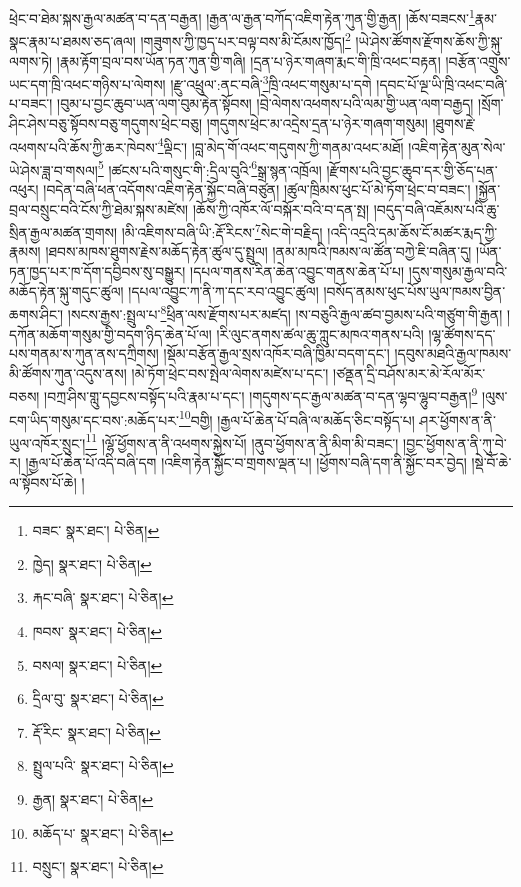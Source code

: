 ཕྲེང་བ་ཐེམ་སྐས་རྒྱལ་མཚན་བ་དན་བརྒྱན། །རྒྱན་ལ་རྒྱན་བཀོད་འཇིག་རྟེན་ཀུན་གྱི་རྒྱན། །ཆོས་བཟངས་\footnote{བཟང་  སྣར་ཐང་།  པེ་ཅིན། }རྣམ་སྣང་རྣམ་པ་ཐམས་ཅད་ཞལ། །གཟུགས་ཀྱི་ཁྱད་པར་བལྟ་བས་མི་ངོམས་ཁྱོད།\footnote{ཁྱེད།  སྣར་ཐང་།  པེ་ཅིན། } །ཡེ་ཤེས་ཚོགས་རྫོགས་ཆོས་ཀྱི་སྐུ་ལགས་ཏེ། །རྣམ་རྟོག་བྲལ་བས་ཡོན་ཏན་ཀུན་གྱི་གཞི། །དྲན་པ་ཉེར་གཞག་རྨང་གི་ཁྲི་འཕང་བརྟན། །བརྩོན་འགྲུས་ཡང་དག་ཁྲི་འཕང་གཉིས་པ་ལེགས། །རྫུ་འཕྲུལ་:ནང་བཞི་\footnote{རྐང་བཞི་  སྣར་ཐང་།  པེ་ཅིན། }ཁྲི་འཕང་གསུམ་པ་དགེ །དབང་པོ་ལྔ་ཡི་ཁྲི་འཕང་བཞི་པ་བཟང་། །བུམ་པ་བྱང་ཆུབ་ཡན་ལག་བུམ་རྟེན་སྟོབས། །བྲེ་ལེགས་འཕགས་པའི་ལམ་གྱི་ཡན་ལག་བརྒྱད། །སྲོག་ཤིང་ཤེས་བཅུ་སྟོབས་བཅུ་གདུགས་ཕྲེང་བཅུ། །གདུགས་ཕྲེང་མ་འདྲེས་དྲན་པ་ཉེར་གཞག་གསུམ། །ཐུགས་རྗེ་འཕགས་པའི་ཆོས་ཀྱི་ཆར་ཁེབས་\footnote{ཁབས་  སྣར་ཐང་།  པེ་ཅིན། }ལྡིང་། །བླ་མེད་གོ་འཕང་གདུགས་ཀྱི་གནམ་འཕང་མཐོ། །འཇིག་རྟེན་མུན་སེལ་ཡེ་ཤེས་ཟླ་བ་གསལ།\footnote{བསལ།  སྣར་ཐང་།  པེ་ཅིན། } །ཚངས་པའི་གསུང་གི་:དྲིལ་བུའི་\footnote{དྲིལ་བུ་  སྣར་ཐང་།  པེ་ཅིན། }སྒྲ་སྙན་འཁྲོལ། །རྫོགས་པའི་བྱང་ཆུབ་དར་གྱི་ཅོད་པན་འཕུར། །བདེན་བཞི་ཕན་འདོགས་འཇིག་རྟེན་སྐྱོང་བཞི་བཙུན། །ཚུལ་ཁྲིམས་ཕུང་པོ་མེ་ཏོག་ཕྲེང་བ་བཟང་། །སྐྱོན་བྲལ་བསྲུང་བའི་ངོས་ཀྱི་ཐེམ་སྐས་མཛེས། །ཆོས་ཀྱི་འཁོར་ལོ་བསྐོར་བའི་བ་དན་སྤ། །བདུད་བཞི་འཇོམས་པའི་ཆུ་སྲིན་རྒྱལ་མཚན་གྲགས། །མི་འཇིགས་བཞི་ཡི་:རྡོ་རིངས་\footnote{རྡོ་རིང་  སྣར་ཐང་།  པེ་ཅིན། }སེང་གེ་བརྗིད། །འདི་འདྲའི་དམ་ཆོས་ངོ་མཚར་རྨད་ཀྱི་རྣམས། །ཐབས་མཁས་ཐུགས་རྗེས་མཆོད་རྟེན་ཚུལ་དུ་སྤྲུལ། །ནམ་མཁའི་ཁམས་ལ་ཚོན་བཀྱེ་ཇི་བཞིན་དུ། །ཡོན་ཏན་ཁྱད་པར་ཁ་དོག་དབྱིབས་སུ་བསྒྱུར། །དཔལ་གནས་རིན་ཆེན་འབྱུང་གནས་ཆེན་པོ་པ། །དུས་གསུམ་རྒྱལ་བའི་མཆོད་རྟེན་སྐུ་གདུང་ཚུལ། །དཔལ་འབྱུང་ཀ་ནི་ཀ་དང་རབ་འབྱུང་ཚུལ། །བསོད་ནམས་ཕུང་པོས་ཡུལ་ཁམས་བྱིན་ཆགས་ཤིང་། །སངས་རྒྱས་:སྤྲུལ་པ་\footnote{སྤྲུལ་པའི་  སྣར་ཐང་།  པེ་ཅིན། }ཕྲིན་ལས་རྫོགས་པར་མཛད། །ས་བཅུའི་རྒྱལ་ཚབ་བྱམས་པའི་གཙུག་གི་རྒྱན། །དཀོན་མཆོག་གསུམ་གྱི་བདག་ཉིད་ཆེན་པོ་ལ། །རི་ལུང་ནགས་ཚལ་ཆུ་ཀླུང་མཁའ་གནས་པའི། །ལྷ་ཚོགས་དད་པས་གནམ་ས་ཀུན་ནས་དཀྲིགས། །སྡོམ་བརྩོན་རྒྱལ་སྲས་འཁོར་བཞི་ཁྱིམ་བདག་དང་། །དབུས་མཐའི་རྒྱལ་ཁམས་མི་ཚོགས་ཀུན་འདུས་ནས། །མེ་ཏོག་ཕྲེང་བས་སྤེལ་ལེགས་མཛེས་པ་དང་། །ཙནྡན་དྲི་བཤོས་མར་མེ་རོལ་མོར་བཅས། །བཀྲ་ཤིས་གླུ་དབྱངས་བསྟོད་པའི་རྣམ་པ་དང་། །གདུགས་དང་རྒྱལ་མཚན་བ་དན་ལྷབ་ལྷུབ་བརྒྱན།\footnote{རྒྱན།  སྣར་ཐང་།  པེ་ཅིན། } །ལུས་ངག་ཡིད་གསུམ་དང་བས་:མཆོད་པར་\footnote{མཆོད་པ་  སྣར་ཐང་།  པེ་ཅིན། }བགྱི། །རྒྱལ་པོ་ཆེན་པོ་བཞི་ལ་མཆོད་ཅིང་བསྟོད་པ། ཤར་ཕྱོགས་ན་ནི་ཡུལ་འཁོར་སྲུང་།\footnote{བསྲུང་།  སྣར་ཐང་།  པེ་ཅིན། } །ལྷོ་ཕྱོགས་ན་ནི་འཕགས་སྐྱེས་པོ། །ནུབ་ཕྱོགས་ན་ནི་མིག་མི་བཟང་། །བྱང་ཕྱོགས་ན་ནི་ཀུ་བེ་ར། །རྒྱལ་པོ་ཆེན་པོ་འདི་བཞི་དག །འཇིག་རྟེན་སྐྱོང་བ་གྲགས་ལྡན་པ། །ཕྱོགས་བཞི་དག་ནི་སྐྱོང་བར་བྱེད། །སྡེ་བོ་ཆེ་ལ་སྟོབས་པོ་ཆེ། །
